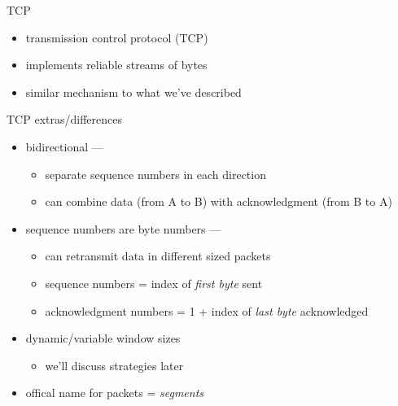 \begin{frame}{TCP}
    \begin{itemize}
    \item transmission control protocol (TCP)
    \item implements reliable streams of bytes
    \item similar mechanism to what we've described
    \end{itemize}
\end{frame}

\begin{frame}{TCP extras/differences}
    \begin{itemize}
    \item bidirectional ---
        \begin{itemize}
        \item separate sequence numbers in each direction
        \item can combine data (from A to B) with acknowledgment (from B to A)
        \end{itemize}
    \item sequence numbers are byte numbers ---
        \begin{itemize}
        \item can retransmit data in different sized packets
        \item sequence numbers = index of \textit{first byte} sent
        \item acknowledgment numbers = 1 + index of \textit{last byte} acknowledged
        \end{itemize}
    \item dynamic/variable window sizes
        \begin{itemize}
        \item we'll discuss strategies later
        \end{itemize}
    \item offical name for packets = \textit{segments}
    \end{itemize}
\end{frame}

